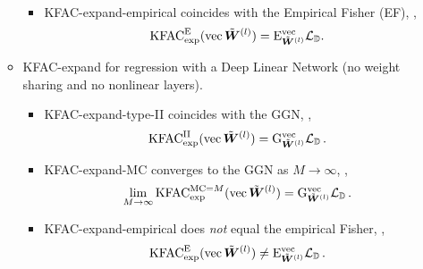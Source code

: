 \begin{itemize}
\begin{itemize}
\begin{itemize}
\begin{align*}
            \end{align*}
          \item KFAC-expand-empirical coincides with the Empirical Fisher (EF), \ie,
            \begin{align*}
              \mathrm{KFAC}^{\text{E}}_{\text{exp}}(\operatorname{vec}\tilde{{\bm{W}}}^{(l)}) = \mathrm{E}^{\operatorname{vec}}_{\tilde{{\bm{W}}}^{(l)}}{\mathcal{L}}_{{\mathbb{D}}}.
            \end{align*}
        \end{itemize}
      \item KFAC-expand for regression with a Deep Linear Network (no weight sharing and no nonlinear layers).
        \begin{itemize}
          \item KFAC-expand-type-II coincides with the GGN, \ie,
            \begin{align*}
              \mathrm{KFAC}^{\text{II}}_{\text{exp}}(\operatorname{vec} \tilde{{\bm{W}}}^{(l)}) = \mathrm{G}^{\operatorname{vec}}_{\tilde{{\bm{W}}}^{(l)}} {\mathcal{L}}_{{\mathbb{D}}}\,.
            \end{align*}
          \item KFAC-expand-MC converges to the GGN as $M\rightarrow\infty$, \ie,
            \begin{align*}
              \lim_{M \to \infty} \mathrm{KFAC}^{\text{MC}=M}_{\text{exp}}(\operatorname{vec} \tilde{{\bm{W}}}^{(l)}) = \mathrm{G}^{\operatorname{vec}}_{\tilde{{\bm{W}}}^{(l)}} {\mathcal{L}}_{{\mathbb{D}}}\,.
            \end{align*}
          \item KFAC-expand-empirical does \emph{not} equal the empirical Fisher, \ie,
            \begin{align*}
              \mathrm{KFAC}_{\text{exp}}^{\text{E}}(\operatorname{vec} \tilde{{\bm{W}}}^{(l)})
              \neq
              \mathrm{E}^{\operatorname{vec}}_{\tilde{{\bm{W}}}^{(l)}} {\mathcal{L}}_{{\mathbb{D}}}\,.
            \end{align*}
        \end{itemize}
      \end{itemize}
    \end{itemize}
